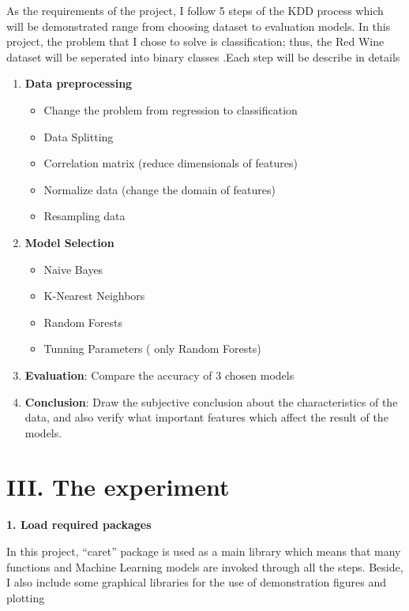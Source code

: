 \documentclass{article}
\providecommand{\tightlist}{%
      \setlength{\itemsep}{0pt}\setlength{\parskip}{0pt}}
\begin{document}
As the requirements of the project, I follow 5 steps of the KDD process which will be
demonstrated range from choosing dataset to evaluation models. In
this project, the problem that I chose to solve is classification; thus,
the Red Wine dataset will be seperated into binary classes .Each step will
be describe in details

\begin{enumerate}
\item 
	\textbf{Data preprocessing} 
	\begin{itemize}
	\item Change the problem from regression to
classification 
	\item Data Splitting 
	\item Correlation matrix (reduce
dimensionals of features) 
	\item Normalize data (change the domain of
features) 
	\item Resampling data
	\end{itemize}
	
\item
	\textbf{Model Selection}

\begin{itemize}
\tightlist
\item
  Naive Bayes
\item
  K-Nearest Neighbors
\item
  Random Forests
\item
  Tunning Parameters ( only Random Forests)
\end{itemize}

\item
\textbf{Evaluation}: Compare the accuracy of 3 chosen models

\item
\textbf{Conclusion}: Draw the subjective conclusion about the
characteristics of the data, and also verify what important features
which affect the result of the models.
\end{enumerate}


\section*{III. The experiment}\label{iii.-the-experiment}

\hspace{5mm}\textbf{1. Load required packages}

In this project, ``caret'' package is used as a main library which means
that many functions and Machine Learning models are invoked through all
the steps. Beside, I also include some graphical libraries for the use
of demonstration figures and plotting
\end{document}
